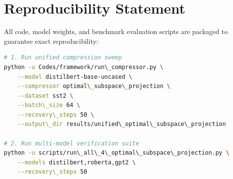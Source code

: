 \section{Reproducibility Statement}
All code, model weights, and benchmark evaluation scripts are packaged to guarantee exact reproducibility:
\begin{lstlisting}[language=bash]
# 1. Run unified compression sweep
python -u Codes/framework/run\_compressor.py \
    --model distilbert-base-uncased \
    --compressor optimal\_subspace\_projection \
    --dataset sst2 \
    --batch\_size 64 \
    --recovery\_steps 50 \
    --output\_dir results/unified\_optimal\_subspace\_projection

# 2. Run multi-model verification suite
python -u scripts/run\_all\_4\_optimal\_subspace\_projection.py \
    --models distilbert,roberta,gpt2 \
    --recovery\_steps 50
\end{lstlisting}
